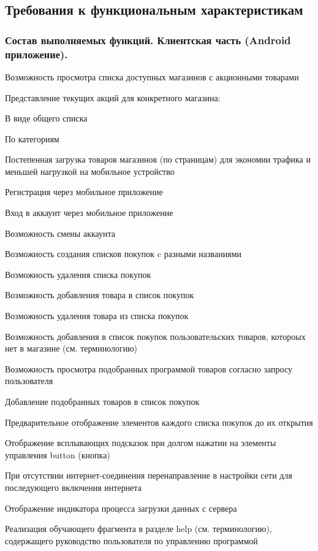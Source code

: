 \subsection{Требования к функциональным характеристикам}

\subsubsection{Состав выполняемых функций. Клиентская часть (Android приложение).}
\begin{my_enumerate}
\item Возможность просмотра списка доступных магазинов с акционными товарами
\item Представление текущих акций для конкретного магазина:
    \begin{my_enumerate}
    \item В виде общего списка
    \item По категориям
    \end{my_enumerate}
\item Постепенная загрузка товаров магазинов (по страницам) для экономии трафика и меньшей нагрузкой на мобильное устройство
\item Регистрация через мобильное приложение
\item Вход в аккаунт через мобильное приложение
\item Возможность смены аккаунта
\item Возможность создания списков покупок c разными названиями
\item Возможность удаления списка покупок
\item Возможность добавления товара в список покупок
\item Возможность удаления товара из списка покупок
\item Возможность добавления в список покупок пользовательских товаров, котороых нет в магазине (см. терминологию)
\item Возможность просмотра подобранных программой товаров согласно запросу пользователя
\item Добавление подобранных товаров в список покупок
\item Предварительное отображение элементов каждого списка покупок до их открытия
\item Отображение всплывающих подсказок при долгом нажатии на элементы управления button (кнопка)
\item При отсутствии интернет-соединения перенаправление в настройки сети для последующего включения интернета
\item Отображение индикатора процесса загрузки данных с сервера
\item Реализация обучающего фрагмента в разделе help (см. терминологию), содержащего руководство пользователя по управлению программой
\end{my_enumerate}

